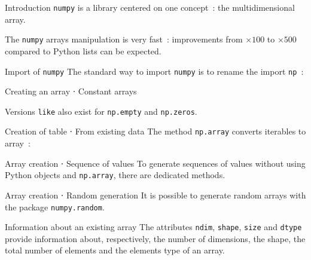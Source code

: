 \begin{frame}{Introduction}
  \texttt{numpy} is a library centered on one concept~: the multidimensional array.

  The \texttt{numpy} arrays manipulation is very fast~: improvements from $\times 100$ to $\times 500$ compared to Python lists can be expected.
\end{frame}

\begin{frame}{Import of \texttt{numpy}}
  The standard way to import \texttt{numpy} is to rename the import \texttt{np}~:

\end{frame}

\begin{frame}{Creating an array ⋅ Constant arrays}

  Versions \texttt{like} also exist for \texttt{np.empty} and \texttt{np.zeros}.
\end{frame}

\begin{frame}{Creation of table ⋅ From existing data}
  The method \texttt{np.array} converts iterables to array~:

\end{frame}

\begin{frame}{Array creation ⋅ Sequence of values}
  To generate sequences of values without using Python objects and \texttt{np.array}, there are dedicated methods.
\end{frame}

\begin{frame}{Array creation ⋅ Random generation}
  It is possible to generate random arrays with the package \texttt{numpy.random}.
\end{frame}

\begin{frame}{Information about an existing array}
  The attributes \texttt{ndim}, \texttt{shape}, \texttt{size} and \texttt{dtype} provide information about, respectively, the number of dimensions, the shape, the total number of elements and the elements type of an array.
\end{frame}

